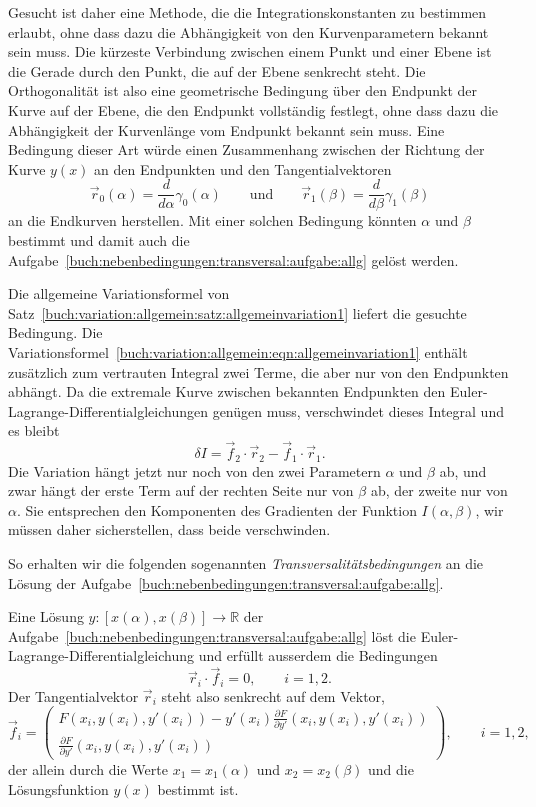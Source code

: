 Gesucht ist daher eine Methode, die die Integrationskonstanten zu bestimmen
erlaubt, ohne dass dazu die Abhängigkeit von den Kurvenparametern bekannt
sein muss.
Die kürzeste Verbindung zwischen einem Punkt und einer Ebene ist die
Gerade durch den Punkt, die auf der Ebene senkrecht steht.
Die Orthogonalität ist also eine geometrische Bedingung über den Endpunkt
der Kurve auf der Ebene, die den Endpunkt vollständig festlegt, ohne dass
dazu die Abhängigkeit der Kurvenlänge vom Endpunkt bekannt sein muss.
Eine Bedingung dieser Art würde einen Zusammenhang zwischen der Richtung
der Kurve $y(x)$ an den Endpunkten und den Tangentialvektoren
\[
\vec{r}_0(\alpha)
=
\frac{d}{d\alpha}\gamma_0(\alpha)
\qquad\text{und}\qquad
\vec{r}_1(\beta)
=
\frac{d}{d\beta}\gamma_1(\beta)
\]
an die Endkurven herstellen.
Mit einer solchen Bedingung könnten $\alpha$ und $\beta$ bestimmt und
damit auch die
Aufgabe~\ref{buch:nebenbedingungen:transversal:aufgabe:allg}
gelöst werden.

Die allgemeine Variationsformel von
Satz~\ref{buch:variation:allgemein:satz:allgemeinvariation1}
liefert die gesuchte Bedingung.
Die Variationsformel~\eqref{buch:variation:allgemein:eqn:allgemeinvariation1}
enthält zusätzlich zum vertrauten Integral zwei Terme, die aber nur von
den Endpunkten abhängt.
Da die extremale Kurve zwischen bekannten Endpunkten den
Euler-Lagrange-Differentialgleichungen genügen muss, verschwindet dieses
Integral und es bleibt
\[
\delta I
=
\vec{f}_2\cdot\vec{r}_2 - \vec{f}_1\cdot\vec{r}_1.
\]
Die Variation hängt jetzt nur noch von den zwei Parametern
$\alpha$ und $\beta$ ab, und zwar hängt der erste Term auf der rechten
Seite nur von $\beta$ ab, der zweite nur von $\alpha$.
Sie entsprechen den Komponenten des Gradienten der Funktion
$I(\alpha,\beta)$, wir müssen daher sicherstellen, dass beide
verschwinden.

So erhalten wir die folgenden sogenannten {\em Transversalitätsbedingungen}
an die Lösung der Aufgabe~\ref{buch:nebenbedingungen:transversal:aufgabe:allg}.
%

\begin{satz}[Transversalität]
\label{buch:nebenbedingungen:transversal:satz:transversal}
%
Eine Lösung $y\colon [x(\alpha),x(\beta)]\to \mathbb{R}$ der 
Aufgabe~\ref{buch:nebenbedingungen:transversal:aufgabe:allg}
löst die Euler-Lagrange-Differentialgleichung und erfüllt ausserdem
die Bedingungen
\begin{equation}
\vec{r}_i\cdot\vec{f}_i=0,\qquad i=1,2.
\end{equation}
Der Tangentialvektor $\vec{r}_i$ steht also senkrecht auf dem Vektor,
\begin{equation}
\vec{f}_i
=
\begin{pmatrix}
\displaystyle 
F(x_i, y(x_i),y'(x_i))-y'(x_i)\frac{\partial F}{\partial y'}(x_i,y(x_i),y'(x_i))
\\[3pt]
\displaystyle 
\frac{\partial F}{\partial y'}(x_i,y(x_i),y'(x_i))
\end{pmatrix},
\qquad i=1,2,
\end{equation}
der allein durch die Werte $x_1 = x_1(\alpha)$ und $x_2=x_2(\beta)$
und die Lösungsfunktion $y(x)$ bestimmt ist.
\end{satz}

